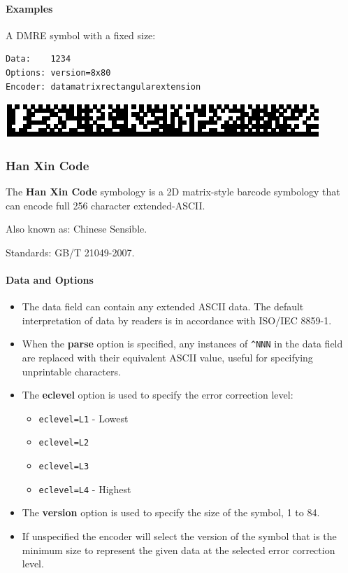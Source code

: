 \hypertarget{examples-8}{%
\paragraph{Examples}\label{examples-8}}

A DMRE symbol with a fixed size:

\begin{verbatim}
Data:    1234
Options: version=8x80
Encoder: datamatrixrectangularextension
\end{verbatim}

\includegraphics{images/datamatrix-4.eps}

\hypertarget{han-xin-code}{%
\subsubsection{Han Xin Code}\label{han-xin-code}}

The \textbf{Han Xin Code} symbology is a 2D matrix-style barcode
symbology that can encode full 256 character extended-ASCII.

Also known as: Chinese Sensible.

Standards: GB/T 21049-2007.

\hypertarget{data-and-options-12}{%
\paragraph{Data and Options}\label{data-and-options-12}}

\begin{itemize}
\tightlist
\item
  The data field can contain any extended ASCII data. The default
  interpretation of data by readers is in accordance with ISO/IEC
  8859-1.
\item
  When the \textbf{parse} option is specified, any instances of
  \texttt{\^{}NNN} in the data field are replaced with their equivalent
  ASCII value, useful for specifying unprintable characters.
\item
  The \textbf{eclevel} option is used to specify the error correction
  level:

  \begin{itemize}
  \tightlist
  \item
    \texttt{eclevel=L1} - Lowest
  \item
    \texttt{eclevel=L2}
  \item
    \texttt{eclevel=L3}
  \item
    \texttt{eclevel=L4} - Highest
  \end{itemize}
\item
  The \textbf{version} option is used to specify the size of the symbol,
  1 to 84.
\item
  If unspecified the encoder will select the version of the symbol that
  is the minimum size to represent the given data at the selected error
  correction level.
\end{itemize}

